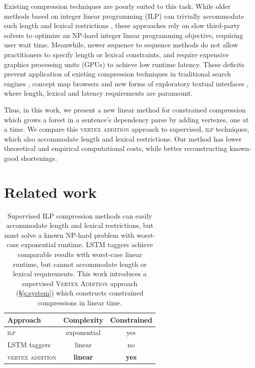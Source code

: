 \documentclass[11pt,a4paper]{article}
\begin{document}
Existing compression techniques are poorly suited to this task. While older methods based on integer linear programming (ILP) can trivially accommodate such length and lexical restrictions \cite{clarke2008global,filippova2013overcoming}, these approaches rely on slow third-party solvers to optimize an NP-hard integer linear programming objective\label{s:relatedwork}, requiring user wait time. Meanwhile, newer sequence to sequence methods \cite{filippova2015sentence} do not allow practitioners to specify length or lexical constraints, and require expensive graphics processing units (GPUs) to achieve low runtime latency. These deficits prevent application of existing compression techniques in traditional search engines \cite{hearst2009search}, concept map browsers \cite{falke2017graphdocexplore} and new forms of exploratory textual interfaces \cite{marchionini2006exploratory}, where length, lexical and latency requirements are paramount. 

Thus, in this work, we present a new linear method for constrained compression which grows a forest in a sentence's dependency parse by adding vertexes, one at a time. We compare this \textsc{vertex addition} approach to supervised, \textsc{ilp} techniques, which also accommodate length and lexical restrictions. Our method has lower theoretical and empirical computational costs, while better reconstructing known-good shortenings. 

\section{Related work}\label{s:relatedwork}


\begin{table}[htb!]
\begin{tabular}{lcc}
\textbf{Approach} & \textbf{Complexity} & \textbf{Constrained}  \\ \hline
\textsc{ilp}       &   exponential    & yes     \\
LSTM taggers   & linear              & no         \\   
\textsc{vertex addition}  & \textbf{linear}     &      \textbf{yes}   
\end{tabular}
\caption{Supervised ILP compression methods \cite{clarke2008global,filippova2013overcoming,Wang2017CanSH} can easily accommodate length and lexical restrictions, but must solve a known NP-hard problem with worst-case exponential runtime. LSTM taggers \cite{filippova2015sentence} achieve comparable results with worst-case linear runtime, but cannot accommodate length or lexical requirements. This work introduces a supervised \textsc{Vertex Addition} approach (\S\ref{s:system}) which constructs constrained compressions in linear time.} 
\label{t:algos}
\end{table}
\end{document}
